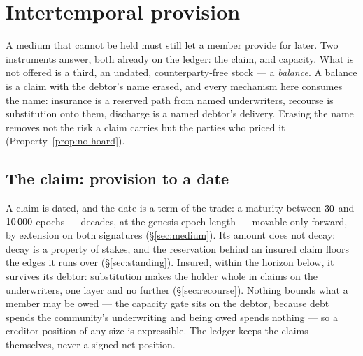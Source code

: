 \section{Intertemporal provision}
\label{sec:provision}

A medium that cannot be held must still let a member provide for later. Two instruments
answer, both already on the ledger: the claim, and capacity. What is not offered is a
third, an undated, counterparty-free stock --- a \emph{balance}. A balance is a claim with
the debtor's name erased, and every mechanism here consumes the name: insurance is a
reserved path from named underwriters, recourse is substitution onto them, discharge is a
named debtor's delivery. Erasing the name removes not the risk a claim carries but the
parties who priced it (Property~\ref{prop:no-hoard}).

\subsection{The claim: provision to a date}

A claim is dated, and the date is a term of the trade: a maturity between
$30$ and $10\,000$ epochs --- decades, at the
genesis epoch length --- movable only forward, by extension on both signatures
(\S\ref{sec:medium}). Its amount does not decay: decay is a property of stakes, and the
reservation behind an insured claim floors the edges it runs over (\S\ref{sec:standing}).
Insured, within the horizon below, it survives its debtor: substitution makes the holder
whole in claims on the underwriters, one layer and no further (\S\ref{sec:recourse}).
Nothing bounds what a member may be owed --- the capacity gate sits on the debtor, because
debt spends the community's underwriting and being owed spends nothing --- so a creditor
position of any size is expressible. The ledger keeps the claims themselves, never a
signed net position.

